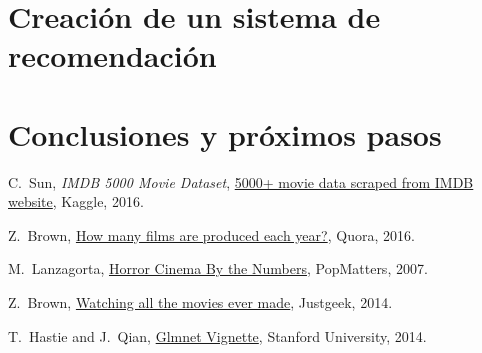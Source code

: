 \documentclass{article}
\begin{document}
\section{Creación de un sistema de recomendación}

\blindtext

\clearpage

\section{Conclusiones y próximos pasos}

\blindtext

\clearpage

\begin{thebibliography}{1}


C.~Sun, \emph{IMDB 5000 Movie Dataset}, \href{https://www.kaggle.com/deepmatrix/imdb-5000-movie-dataset}{5000+ movie data scraped from IMDB website}, \relax Kaggle, 2016.

Z.~Brown, \href{https://www.quora.com/How-many-films-are-produced-each-year}{How many films are produced each year?}, \relax Quora, 2016.

M.~Lanzagorta, \href{http://www.popmatters.com/column/horror-cinema-by-the-numbers/}{Horror Cinema By the Numbers}, \relax PopMatters, 2007.

Z.~Brown, \href{http://www.justgeek.de/watching-all-the-movies-ever-made/}{Watching all the movies ever made}, \relax Justgeek, 2014.

T.~Hastie and J.~Qian, \href{https://web.stanford.edu/~hastie/glmnet/glmnet_alpha.html}{Glmnet Vignette}, \relax Stanford University, 2014.

\end{thebibliography}

%
\end{document}
